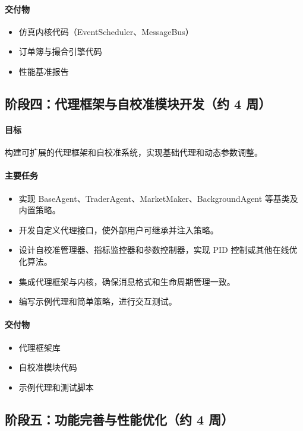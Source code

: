 \paragraph{交付物}
\begin{itemize}
  \item 仿真内核代码（EventScheduler、MessageBus）
  \item 订单簿与撮合引擎代码
  \item 性能基准报告
\end{itemize}

\subsection{阶段四：代理框架与自校准模块开发（约 4 周）}

\paragraph{目标} 构建可扩展的代理框架和自校准系统，实现基础代理和动态参数调整。

\paragraph{主要任务}
\begin{itemize}
  \item 实现 BaseAgent、TraderAgent、MarketMaker、BackgroundAgent 等基类及内置策略。
  \item 开发自定义代理接口，使外部用户可继承并注入策略。
  \item 设计自校准管理器、指标监控器和参数控制器，实现 PID 控制或其他在线优化算法。
  \item 集成代理框架与内核，确保消息格式和生命周期管理一致。
  \item 编写示例代理和简单策略，进行交互测试。
\end{itemize}

\paragraph{交付物}
\begin{itemize}
  \item 代理框架库
  \item 自校准模块代码
  \item 示例代理和测试脚本
\end{itemize}

\subsection{阶段五：功能完善与性能优化（约 4 周）}

